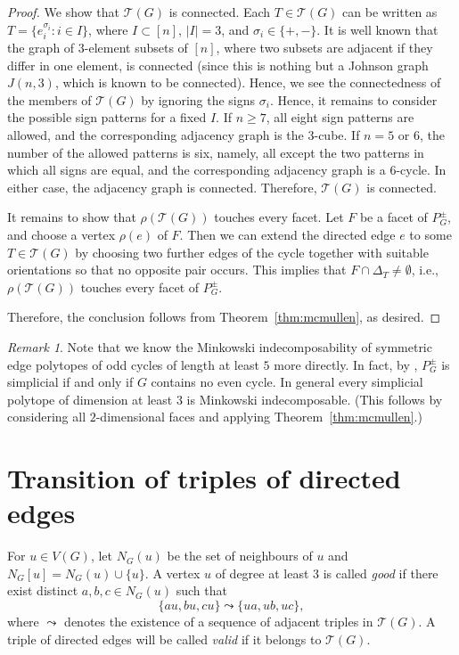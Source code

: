 \documentclass[11pt,a4paper]{amsart}
\theoremstyle{definition}
\theoremstyle{remark}
\newtheorem{remark}[theorem]{Remark}
\newcommand{\Tc}{{\mathcal T}}
\begin{document}
{\begin{proof}
We show that $\Tc(G)$ is connected. 
Each $T\in \Tc(G)$ can be written as $T=\{e_i^{\sigma_i}:i\in I\}$, where $I\subset [n]$, $|I|=3$, and $\sigma_i\in\{+,-\}$. 
It is well known that the graph of $3$-element subsets of $[n]$, where two subsets are adjacent if they differ in one element, is connected
(since this is nothing but a Johnson graph $J(n,3)$, which is known to be connected).  
Hence, we see the connectedness of the members of $\Tc(G)$ by ignoring the signs $\sigma_i$. 
Hence, it remains to consider the possible sign patterns for a fixed $I$.
If $n \ge 7$, all eight sign patterns are allowed, and the corresponding adjacency graph is the $3$-cube. If $n=5$ or $6$, the number of the allowed patterns is six, namely, all except the two patterns in which all signs are equal, and the corresponding adjacency graph is a $6$-cycle. In either case, the adjacency graph is connected.
Therefore, $\Tc(G)$ is connected. 

It remains to show that $\rho(\Tc(G))$ touches every facet. Let $F$ be a facet of $P_G^{\pm}$, and choose a vertex $\rho(e)$ of $F$. 
Then we can extend the directed edge $e$ to some $T\in\Tc(G)$ by choosing two further edges of the cycle together with suitable orientations so that no opposite pair occurs. 
This implies that $F \cap \Delta_T\ne\emptyset$, i.e., $\rho(\Tc(G))$ touches every facet of $P_G^\pm$. 

Therefore, the conclusion follows from Theorem~\ref{thm:mcmullen}, as desired. 
\end{proof}
\begin{remark}
Note that we know the Minkowski indecomposability of symmetric edge polytopes of odd cycles of length at least $5$ more directly. 
In fact, by \cite[Corollary 2.3]{H}, $P_G^\pm$ is simplicial if and only if $G$ contains no even cycle. 
In general every simplicial polytope of dimension at least $3$ is Minkowski indecomposable. 
(This follows by considering all $2$-dimensional faces and applying Theorem~\ref{thm:mcmullen}.) 
\end{remark}


\bigskip
\section{Transition of triples of directed edges}\label{sec:transition}

For $u\in V(G)$, let $N_G(u)$ be the set of neighbours of $u$ and
$N_G[u]=N_G(u)\cup\{u\}$.  A vertex $u$ of degree at least $3$ is called
\emph{good} if there exist distinct $a,b,c\in N_G(u)$ such that
\[\{au,bu,cu\}\leadsto \{ua,ub,uc\},\]
where $\leadsto$ denotes the existence of a sequence of adjacent triples in $\Tc(G)$. 
A triple of directed edges will be called \emph{valid} if it belongs to $\Tc(G)$. 

}
\end{document}
